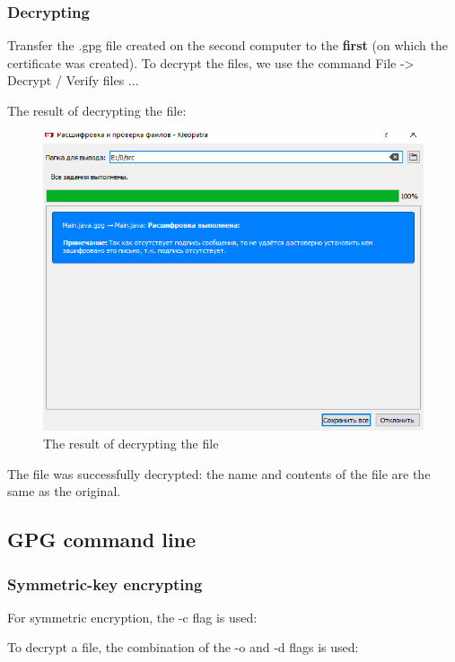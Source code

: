 \documentclass[14pt,a4paper,report]{report}
\begin{document}
\subsubsection{Decrypting}

Transfer the .gpg file created on the second computer to the \textbf{first} (on which the certificate was created). To decrypt the files, we use the command File -> Decrypt / Verify files ...

The result of decrypting the file:

\begin{figure}[h!]
	\centering
	\includegraphics[scale = 0.6]{images/3_3.png}
	\caption{The result of decrypting the file}
\end{figure}

The file was successfully decrypted: the name and contents of the file are the same as the original.

\subsection{GPG command line}

\subsubsection{Symmetric-key encrypting}

For symmetric encryption, the -c flag is used:



To decrypt a file, the combination of the -o and -d flags is used:
\end{document}
